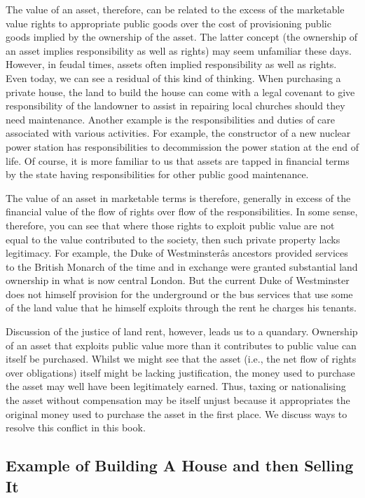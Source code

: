 \documentclass[]{tufte-handout}
\begin{document}
The value of an asset, therefore, can be related to the excess of the
marketable value rights to appropriate public goods over the cost of
provisioning public goods implied by the ownership of the asset. The
latter concept (the ownership of an asset implies responsibility as well
as rights) may seem unfamiliar these days. However, in feudal times,
assets often implied responsibility as well as rights. Even today, we
can see a residual of this kind of thinking. When purchasing a private
house, the land to build the house can come with a legal covenant to
give responsibility of the landowner to assist in repairing local
churches should they need maintenance. Another example is the
responsibilities and duties of care associated with various activities.
For example, the constructor of a new nuclear power station has
responsibilities to decommission the power station at the end of life.
Of course, it is more familiar to us that assets are tapped in financial
terms by the state having responsibilities for other public good
maintenance.

The value of an asset in marketable terms is therefore, generally in
excess of the financial value of the flow of rights over flow of the
responsibilities. In some sense, therefore, you can see that where those
rights to exploit public value are not equal to the value contributed to
the society, then such private property lacks legitimacy. For example,
the Duke of Westminsterâs ancestors provided services to the British
Monarch of the time and in exchange were granted substantial land
ownership in what is now central London. But the current Duke of
Westminster does not himself provision for the underground or the bus
services that use some of the land value that he himself exploits
through the rent he charges his tenants.

Discussion of the justice of land rent, however, leads us to a quandary.
Ownership of an asset that exploits public value more than it
contributes to public value can itself be purchased. Whilst we might see
that the asset (i.e., the net flow of rights over obligations) itself
might be lacking justification, the money used to purchase the asset may
well have been legitimately earned. Thus, taxing or nationalising the
asset without compensation may be itself unjust because it appropriates
the original money used to purchase the asset in the first place. We
discuss ways to resolve this conflict in this book.

\hypertarget{example-of-building-a-house-and-then-selling-it}{%
\subsection{\texorpdfstring{\textbf{Example of Building A House and then
Selling
It}}{Example of Building A House and then Selling It}}\label{example-of-building-a-house-and-then-selling-it}}
\end{document}
